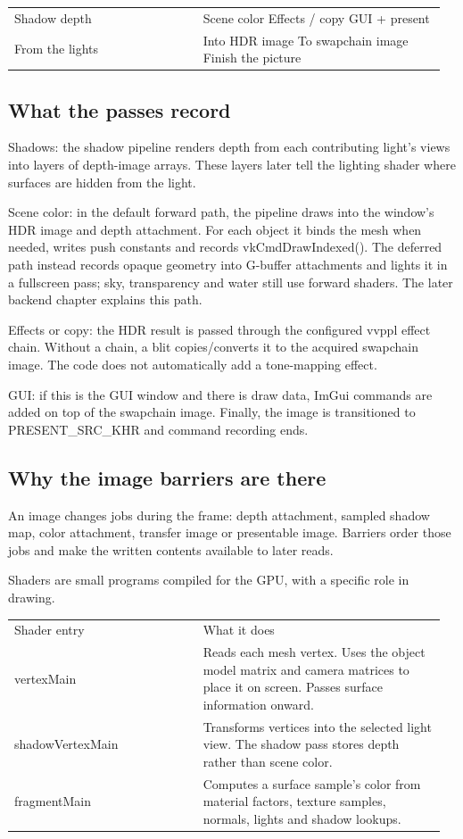 \documentclass[11pt,a4paper]{article}
\begin{document}
{\small
\begin{longtable}{@{}p{0.42\linewidth}p{0.54\linewidth}@{}}
Shadow depth & Scene color       Effects / copy           GUI + present \\
From the lights & Into HDR image   To swapchain image        Finish the picture \\
\end{longtable}
}

\subsection*{What the passes record}
Shadows: the shadow pipeline renders depth from each contributing light's views into layers of depth-image arrays. These layers later tell the lighting shader where surfaces are hidden from the light.

Scene color: in the default forward path, the pipeline draws into the window's HDR image and depth attachment. For each object it binds the mesh when needed, writes push constants and records vkCmdDrawIndexed(). The deferred path instead records opaque geometry into G-buffer attachments and lights it in a fullscreen pass; sky, transparency and water still use forward shaders. The later backend chapter explains this path.

Effects or copy: the HDR result is passed through the configured vvppl effect chain. Without a chain, a blit copies/converts it to the acquired swapchain image. The code does not automatically add a tone-mapping effect.

GUI: if this is the GUI window and there is draw data, ImGui commands are added on top of the swapchain image. Finally, the image is transitioned to PRESENT\_SRC\_KHR and command recording ends.

\subsection*{Why the image barriers are there}
An image changes jobs during the frame: depth attachment, sampled shadow map, color attachment, transfer image or presentable image. Barriers order those jobs and make the written contents available to later reads.

\label{core-40}
Shaders are small programs compiled for the GPU, with a specific role in drawing.

{\small
\begin{longtable}{@{}p{0.42\linewidth}p{0.54\linewidth}@{}}
Shader entry & What it does \\
vertexMain & Reads each mesh vertex. Uses the object model matrix and camera matrices to place it on screen. Passes surface information onward. \\
shadowVertexMain & Transforms vertices into the selected light view. The shadow pass stores depth rather than scene color. \\
fragmentMain & Computes a surface sample's color from material factors, texture samples, normals, lights and shadow lookups. \\
\end{longtable}
}
\end{document}
